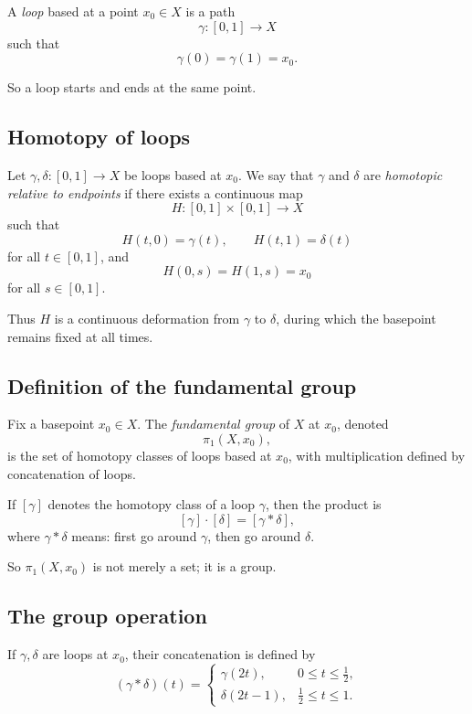 \documentclass[12pt,a4paper]{article}
\theoremstyle{notespace}
\begin{document}
A \emph{loop} based at a point \(x_0\in X\) is a path
\[
\gamma:[0,1]\to X
\]
such that
\[
\gamma(0)=\gamma(1)=x_0.
\]

So a loop starts and ends at the same point.

\bigskip

\subsection{Homotopy of loops}

Let \(\gamma,\delta:[0,1]\to X\) be loops based at \(x_0\). We say that \(\gamma\) and \(\delta\) are \emph{homotopic relative to endpoints} if there exists a continuous map
\[
H:[0,1]\times[0,1]\to X
\]
such that
\[
H(t,0)=\gamma(t),\qquad H(t,1)=\delta(t)
\]
for all \(t\in[0,1]\), and
\[
H(0,s)=H(1,s)=x_0
\]
for all \(s\in[0,1]\).

Thus \(H\) is a continuous deformation from \(\gamma\) to \(\delta\), during which the basepoint remains fixed at all times.

\bigskip

\subsection{Definition of the fundamental group}

Fix a basepoint \(x_0\in X\). The \emph{fundamental group} of \(X\) at \(x_0\), denoted
\[
\pi_1(X,x_0),
\]
is the set of homotopy classes of loops based at \(x_0\), with multiplication defined by concatenation of loops.

If \([\gamma]\) denotes the homotopy class of a loop \(\gamma\), then the product is
\[
[\gamma]\cdot[\delta]=[\gamma*\delta],
\]
where \(\gamma*\delta\) means: first go around \(\gamma\), then go around \(\delta\).

So \(\pi_1(X,x_0)\) is not merely a set; it is a group.

\bigskip

\subsection{The group operation}

If \(\gamma,\delta\) are loops at \(x_0\), their concatenation is defined by
\[
(\gamma*\delta)(t)=
\begin{cases}
	\gamma(2t), & 0\le t\le \frac12,\\[4pt]
	\delta(2t-1), & \frac12\le t\le 1.
\end{cases}
\]
\end{document}
